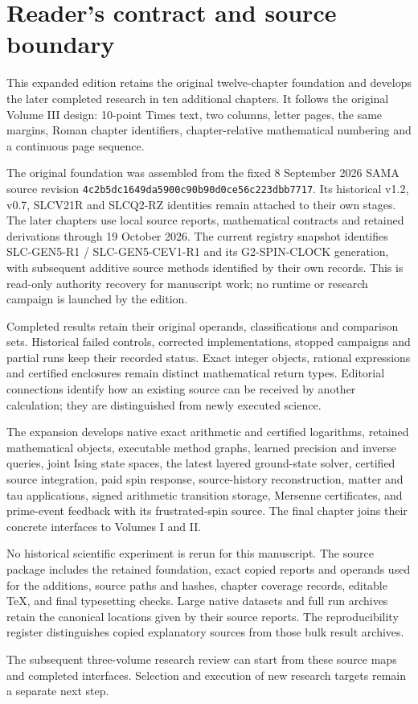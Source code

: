 \section*{Reader's contract and source boundary}
{}
This expanded edition retains the original twelve-chapter foundation and develops the later completed research in ten additional chapters. It follows the original Volume III design: 10-point Times text, two columns, letter pages, the same margins, Roman chapter identifiers, chapter-relative mathematical numbering and a continuous page sequence.

The original foundation was assembled from the fixed 8 September 2026 SAMA source revision \texttt{4c2b5dc1649da5900c90b90d0ce56c223dbb7717}. Its historical v1.2, v0.7, SLCV21R and SLCQ2-RZ identities remain attached to their own stages. The later chapters use local source reports, mathematical contracts and retained derivations through 19 October 2026. The current registry snapshot identifies SLC-GEN5-R1 / SLC-GEN5-CEV1-R1 and its G2-SPIN-CLOCK generation, with subsequent additive source methods identified by their own records. This is read-only authority recovery for manuscript work; no runtime or research campaign is launched by the edition.

Completed results retain their original operands, classifications and comparison sets. Historical failed controls, corrected implementations, stopped campaigns and partial runs keep their recorded status. Exact integer objects, rational expressions and certified enclosures remain distinct mathematical return types. Editorial connections identify how an existing source can be received by another calculation; they are distinguished from newly executed science.

The expansion develops native exact arithmetic and certified logarithms, retained mathematical objects, executable method graphs, learned precision and inverse queries, joint Ising state spaces, the latest layered ground-state solver, certified source integration, paid spin response, source-history reconstruction, matter and tau applications, signed arithmetic transition storage, Mersenne certificates, and prime-event feedback with its frustrated-spin source. The final chapter joins their concrete interfaces to Volumes I and II.

No historical scientific experiment is rerun for this manuscript. The source package includes the retained foundation, exact copied reports and operands used for the additions, source paths and hashes, chapter coverage records, editable TeX, and final typesetting checks. Large native datasets and full run archives retain the canonical locations given by their source reports. The reproducibility register distinguishes copied explanatory sources from those bulk result archives.

The subsequent three-volume research review can start from these source maps and completed interfaces. Selection and execution of new research targets remain a separate next step.
